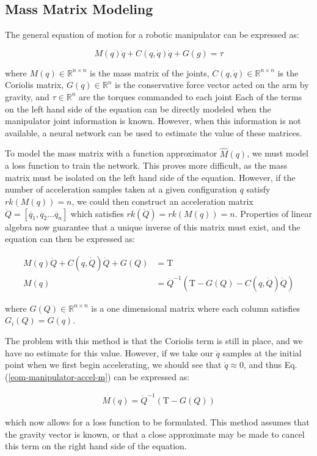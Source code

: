 \subsection*{Mass Matrix Modeling}

The general equation of motion for a robotic manipulator can be expressed as:

\begin{equation}
  \label{eom-manipulator}
  M(q)\ddot{q} + C(q,\dot{q})\dot{q} + G(g) = \tau
\end{equation}

\noindent where $M(q)\in\mathbb{R}^{n\times n}$ is the mass matrix of the joints,
$C(q,\dot{q})\in\mathbb{R}^{n\times n}$ is the Coriolis matrix,
$G(q)\in\mathbb{R}^{n}$ is the conservative force vector acted on the arm by
gravity, and $\tau\in\mathbb{R}^{n}$ are the torques commanded to each joint \cite{spong}
Each of the terms on the left hand side of the equation can be directly modeled
when the manipulator joint information is known.
However, when this information is not available, a neural network can be used to
estimate the value of these matrices.

To model the mass matrix with a function approximator $\hat{M}(q)$, we must
model a loss function to train the network.
This proves more difficult, as the mass matrix must be isolated on the left hand
side of the equation.
However, if the number of acceleration samples taken at a given configuration
$q$ satisfy $rk(M(q)) = n$, we could then construct an acceleration
matrix $\ddot{Q} = [\ddot{q_{1}}, \ddot{q_{2}}\dots\ddot{q_{n}}]$ which
satisfies $rk(\ddot{Q}) = rk(M(q)) = n$.
Properties of linear algebra now guarantee that a unique inverse of this matrix
must exist, and the equation can then be expressed as:

\begin{align}
  \label{eom-manipulator-accel}
  M(q)\ddot{Q} + C(q,\dot{Q})\dot{Q} + G(Q) &= \mathrm{T}\\
  \label{eom-manipulator-accel-m}
  M(q) &= \ddot{Q}^{-1}(\mathrm{T} - G(Q) - C(q,\dot{Q})\dot{Q})
\end{align}

\noindent where $G(Q)\in\mathbb{R}^{n\times n}$ is a one dimensional matrix
where each column satisfies $G_{i}(Q) = G(q)$.

The problem with this method is that the Coriolis term is still in place, and we
have no estimate for this value.
However, if we take our $\ddot{q}$ samples at the initial point when we first
begin accelerating, we should see that $\dot{q} \approx 0$, and thus Eq.
(\ref{eom-manipulator-accel-m}) can be expressed as:

\begin{align}
  M(q) = \ddot{Q}^{-1}(\mathrm{T} - G(Q))
\end{align}

\noindent which now allows for a loss function to be formulated.
This method assumes that the gravity vector is known, or that a close approximate may be made to cancel this term on the right hand side of the equation.
